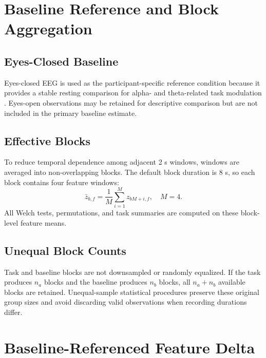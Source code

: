 \documentclass[conference]{IEEEtran}
\begin{document}
\section{Baseline Reference and Block Aggregation}
\subsection{Eyes-Closed Baseline}
Eyes-closed EEG is used as the participant-specific reference condition because it provides a stable resting comparison for alpha- and theta-related task modulation \cite{klimesch1999}. Eyes-open observations may be retained for descriptive comparison but are not included in the primary baseline estimate.

\subsection{Effective Blocks}
To reduce temporal dependence among adjacent 2 s windows, windows are averaged into non-overlapping blocks. The default block duration is 8 s, so each block contains four feature windows:
\begin{equation}
\bar{z}_{b,f}=\frac{1}{M}\sum_{i=1}^{M}z_{bM+i,f},\quad M=4.
\end{equation}
All Welch tests, permutations, and task summaries are computed on these block-level feature means.

\subsection{Unequal Block Counts}
Task and baseline blocks are not downsampled or randomly equalized. If the task produces $n_a$ blocks and the baseline produces $n_b$ blocks, all $n_a+n_b$ available blocks are retained. Unequal-sample statistical procedures preserve these original group sizes and avoid discarding valid observations when recording durations differ.

\section{Baseline-Referenced Feature Delta}
\end{document}
